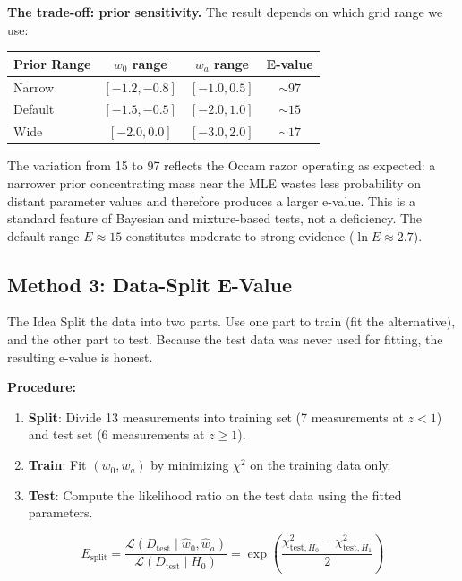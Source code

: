 \documentclass[11pt,a4paper]{article}
\begin{document}
\textbf{The trade-off: prior sensitivity.} The result depends on which grid range we use:

\begin{center}
\begin{tabular}{lccc}
\toprule
\textbf{Prior Range} & $w_0$ range & $w_a$ range & \textbf{E-value} \\
\midrule
Narrow & $[-1.2, -0.8]$ & $[-1.0, 0.5]$ & $\sim 97$ \\
Default & $[-1.5, -0.5]$ & $[-2.0, 1.0]$ & $\sim 15$ \\
Wide & $[-2.0, 0.0]$ & $[-3.0, 2.0]$ & $\sim 17$ \\
\bottomrule
\end{tabular}
\end{center}

The variation from 15 to 97 reflects the Occam razor operating as expected: a narrower prior concentrating mass near the MLE wastes less probability on distant parameter values and therefore produces a larger e-value. This is a standard feature of Bayesian and mixture-based tests, not a deficiency. The default range $E \approx 15$ constitutes moderate-to-strong evidence ($\ln E \approx 2.7$).


\subsection{Method 3: Data-Split E-Value}
\label{sec:datasplit}

\begin{conceptbox}{The Idea}
Split the data into two parts. Use one part to train (fit the alternative), and the other part to test. Because the test data was never used for fitting, the resulting e-value is honest.
\end{conceptbox}

\textbf{Procedure:}
\begin{enumerate}
    \item \textbf{Split}: Divide 13 measurements into training set (7 measurements at $z < 1$) and test set (6 measurements at $z \geq 1$).
    \item \textbf{Train}: Fit $(w_0, w_a)$ by minimizing $\chi^2$ on the training data only.
    \item \textbf{Test}: Compute the likelihood ratio on the test data using the fitted parameters.
\end{enumerate}

\begin{equation}
\boxed{E_{\text{split}} = \frac{\mathcal{L}(D_{\text{test}} \mid \hat{w}_0, \hat{w}_a)}{\mathcal{L}(D_{\text{test}} \mid H_0)} = \exp\!\left(\frac{\chi^2_{\text{test},H_0} - \chi^2_{\text{test},H_1}}{2}\right)}
\label{eq:split}
\end{equation}
\end{document}
